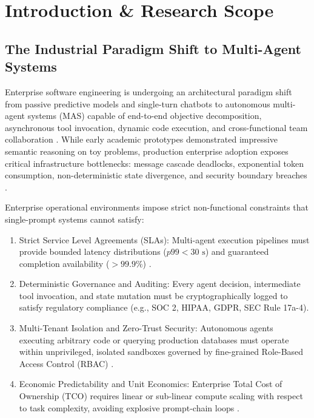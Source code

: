 \documentclass[11pt,a4paper]{article}
\begin{document}
\section{Introduction \& Research Scope}



\subsection{The Industrial Paradigm Shift to Multi-Agent Systems}


Enterprise software engineering is undergoing an architectural paradigm shift from passive predictive models and single-turn chatbots to autonomous multi-agent systems (MAS) capable of end-to-end objective decomposition, asynchronous tool invocation, dynamic code execution, and cross-functional team collaboration \cite{arxiv_2405_01543,arxiv_2005_14165}. While early academic prototypes demonstrated impressive semantic reasoning on toy problems, production enterprise adoption exposes critical infrastructure bottlenecks: message cascade deadlocks, exponential token consumption, non-deterministic state divergence, and security boundary breaches \cite{arxiv_2404_04289,crossref_10_1016_j_aei_2026_104392}.

Enterprise operational environments impose strict non-functional constraints that single-prompt systems cannot satisfy:
\begin{enumerate}
  \item Strict Service Level Agreements (SLAs): Multi-agent execution pipelines must provide bounded latency distributions ($p99 < 30\text{ s}$) and guaranteed completion availability ($>99.9\%$) \cite{crossref_10_1108_jeim_12_2025_1269}.
  \item Deterministic Governance and Auditing: Every agent decision, intermediate tool invocation, and state mutation must be cryptographically logged to satisfy regulatory compliance (e.g., SOC 2, HIPAA, GDPR, SEC Rule 17a-4).
  \item Multi-Tenant Isolation and Zero-Trust Security: Autonomous agents executing arbitrary code or querying production databases must operate within unprivileged, isolated sandboxes governed by fine-grained Role-Based Access Control (RBAC) \cite{arxiv_2404_04289,doaj_001772c2113c476d9d5d40452c8e10e1}.
  \item Economic Predictability and Unit Economics: Enterprise Total Cost of Ownership (TCO) requires linear or sub-linear compute scaling with respect to task complexity, avoiding explosive prompt-chain loops \cite{arxiv_2406_00584}.
\end{enumerate}
\end{document}
